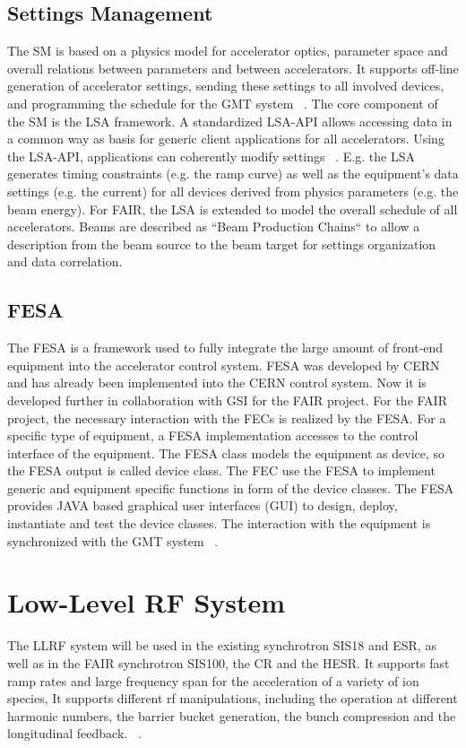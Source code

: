 \subsection{Settings Management}
The \gls{SM} is based on a physics model for accelerator optics, parameter space and overall relations between parameters and between accelerators. It supports off-line generation of accelerator settings, sending these settings to all involved devices, and programming the schedule for the GMT system ~\cite{huhmann_fair_2013}. The core component of the SM is the LSA framework. A standardized  LSA-\gls{API} allows accessing data in a common way as basis for generic client applications for all accelerators. Using the LSA-API, applications can coherently modify settings ~\cite{huhmann_fair_2013}. E.g. the LSA generates timing constraints (e.g. the ramp curve) as well as the equipment's data settings (e.g. the current) for all devices derived from physics parameters (e.g. the beam energy). For FAIR, the LSA is extended to model the overall schedule of all accelerators. Beams are described as ``Beam Production Chains`` to allow a description from the beam source to the beam target for settings organization and data correlation.


\subsection{FESA}
The \gls{FESA} is a framework used to fully integrate the large amount of front-end equipment into the accelerator control system. FESA was developed by CERN and has already been implemented into the \gls{CERN} control system. Now it is developed further in collaboration with GSI for the FAIR project. For the FAIR project, the necessary interaction with the FECs is realized by the FESA. For a specific type of equipment, a FESA implementation accesses to the control interface of the equipment. The FESA class models the equipment as device, so the FESA output is called device class. The \gls{FEC} use the FESA to implement generic and equipment specific functions in form of the device classes. The FESA provides JAVA based graphical user interfaces (GUI) to design, deploy, instantiate and test the device classes. The interaction with the equipment is synchronized with the GMT system ~\cite{hoffmann_fesafront-end_2008}. 



\section{Low-Level RF System}
\label{sec:LLRF}
The \gls{LLRF} system will be used in the existing synchrotron SIS18 and \gls{ESR}, as well as in the FAIR synchrotron SIS100, the \gls{CR} and the HESR. It supports fast ramp rates and large frequency span for the acceleration of a variety of ion species, It supports different rf manipulations, including the operation at different harmonic numbers, the barrier bucket generation, the bunch compression and the longitudinal feedback. ~\cite{klingbeil_new_2011}. 


